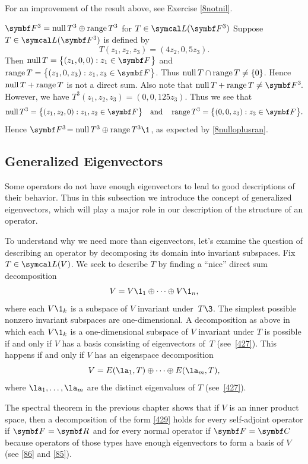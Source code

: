 For an improvement of the result above, see Exercise \ref{8notnil}.

\begin{example}{$\F3 = \ker T^3 \oplus \ran T^3$ for $T \in \L(\F3)$}
Suppose $T \in \L(\F{3})$ is defined by
\[
T(z_1, z_2, z_3) = (4z_2, 0, 5z_3).
\]
Then $\ker T = \br[\big]{(z_1, 0, 0): z_1 \in \F{}}$ and
$\ran T = \br[\big]{(z_1, 0, z_3): z_1, z_3 \in \F{}}$. Thus $\operatorname{null} T \cap \operatorname{range} T \ne \{0\}$. Hence $\operatorname{null} T + \operatorname{range} T$ is not a direct sum. Also note that
$\ker T + \ran T \ne \FF3$. However, we have $T^3(z_1, z_2, z_3) = (0, 0, 125z_3)$. Thus we see that
\[
\ker T^3 = \br[\big]{(z_1, z_2, 0): z_1, z_2 \in \F{}} \andd
\ran T^3 = \br[\big]{(0, 0, z_3): z_3 \in \F{}}.
\]
Hence $\FF3 = \ker T^3 \oplus \ran T^3\1$, as expected by \ref{8nulloplusran}.
\end{example}

\subsection{Generalized Eigenvectors}

Some operators do not have enough eigenvectors to lead to good descriptions of their behavior. Thus in this subsection we introduce the concept of generalized eigenvectors, which will play a major role in our description of the structure of an operator.

To understand why we need more than eigenvectors, let's examine the
question of describing an operator by decomposing its domain into
invariant subspaces.  Fix $T \in \L(V)$.  We seek to describe $T$ by
finding a ``nice'' direct sum decomposition
\[
V = V\1_1 \oplus \dots \oplus V\1_n,
\]
where each $V\1_k$ is a subspace of $V$ invariant under~$T\3$. The simplest
possible nonzero invariant subspaces are one-dimensional.  A
decomposition as above in which each $V\1_k$ is a one-dimensional subspace
of $V$ invariant under $T$ is possible if and only if $V$ has a basis
consisting of eigenvectors of~$T$ (see~\ref{427}). This happens if
and only if $V$ has an eigenspace decomposition
\begin{equation} \label{429}
V = E(\la_1, T) \oplus \dots \oplus E(\la_m, T),
\end{equation}%
where $\la_1, \dots, \la_m$ are the distinct
eigenvalues of $T$ (see~\ref{427}).

The spectral theorem in the previous chapter shows that if $V$ is an inner product space, then a decomposition of the form \ref{429} holds for every self-adjoint operator if $\F{} = \R{}$ and for every normal operator if $\F{} = \C{}$ because operators of those types have enough eigenvectors to form a basis of $V$ (see \ref{86} and \ref{85}).


